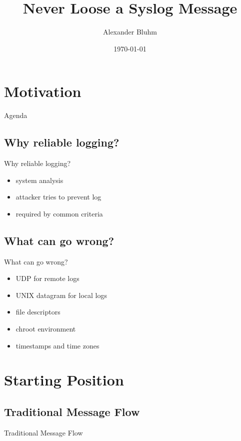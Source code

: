\documentclass[14pt]{beamer}
\author{Alexander Bluhm}
\title{Never Loose a Syslog Message}
\institute{\url{bluhm@openbsd.org}}
\date{\today}
\begin{document}
\begin{frame}
\titlepage
\end{frame}

\section{Motivation}

\begin{frame}{Agenda}
\setcounter{tocdepth}{1}
\tableofcontents
\end{frame}

\subsection{Why reliable logging?}
\begin{frame}{Why reliable logging?}
\begin{itemize}
    \item system analysis
    \item attacker tries to prevent log
    \item required by common criteria
\end{itemize}
\end{frame}

\subsection{What can go wrong?}
\begin{frame}{What can go wrong?}
\begin{itemize}
    \item UDP for remote logs
    \item UNIX datagram for local logs
    \item file descriptors
    \item chroot environment
    \item timestamps and time zones
\end{itemize}
\end{frame}

\section{Starting Position}

\subsection{Traditional Message Flow}
\begin{frame}{Traditional Message Flow}
\end{frame}
\end{document}
